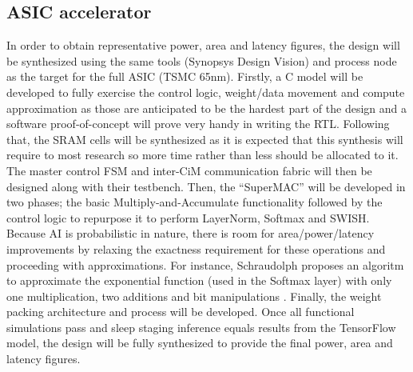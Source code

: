\documentclass[12pt, hidelinks]{article}
\begin{document}
    \subsection{ASIC accelerator}
    In order to obtain representative power, area and latency figures, the design will be synthesized using the same tools (Synopsys Design Vision) and process node as the target for the full ASIC (TSMC 65nm). Firstly, a C model will be developed to fully exercise
    the control logic, weight/data movement and compute approximation as those are anticipated to be the hardest part of the design and a software proof-of-concept will prove very handy in writing the RTL. Following that, the SRAM cells will be synthesized as it is expected
    that this synthesis will require to most research so more time rather than less should be allocated to it. The master control FSM and inter-CiM communication fabric will then be designed along with their testbench. Then, the ``SuperMAC'' will be developed 
    in two phases; the basic Multiply-and-Accumulate functionality followed by the control logic to repurpose it to perform LayerNorm, Softmax and SWISH. Because AI is probabilistic in nature, there is room for area/power/latency improvements by relaxing the exactness
    requirement for these operations and proceeding with approximations. For instance, Schraudolph proposes an algoritm to approximate the exponential function (used in the Softmax layer) with only one multiplication, two additions and bit manipulations \cite*{schraudolph1999fast}.
    Finally, the weight packing architecture and process will be developed. Once all functional simulations pass and sleep staging inference equals results from the TensorFlow model, the design will be fully synthesized to provide the final power, area and latency figures. 
    
\end{document}

